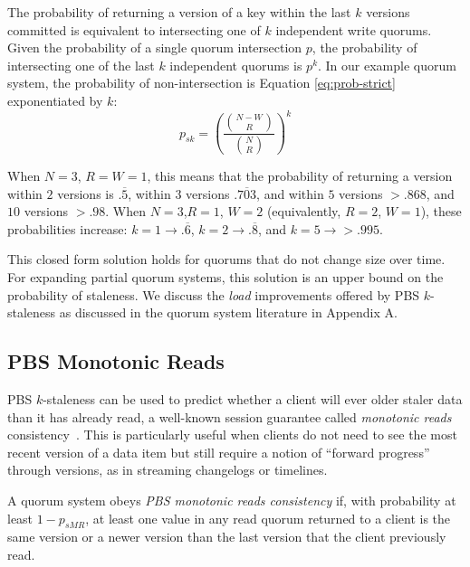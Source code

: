 \documentclass{vldb}
\newcommand{\subsectionskip}{-0em}
\begin{document}
The probability of returning a version of a key within the last $k$
versions committed is equivalent to intersecting one of $k$
independent write quorums.  Given the probability of a single quorum
intersection $p$, the probability of intersecting one of the last $k$
independent quorums is $p^k$.  In our example quorum system, the
probability of non-intersection is Equation \ref{eq:prob-strict}
exponentiated by $k$:
\begin{equation}
\label{eq:k-consistency}
p_{sk} = \left(\frac{{N-W \choose R}}{{N \choose R}}\right)^k
\end{equation}

When $N$$=$$3$, $R$$=$$W$$=$$1$, this means that the probability of
returning a version within $2$ versions is $.\overline{5}$, within $3$
versions $.\overline{703}$, and within $5$ versions $> .868$, and $10$
versions $>.98$.  When $N$$=$$3$,$R$$=$$1$, $W$$=$$2$ (equivalently,
$R$$=$$2$, $W$$=$$1$), these probabilities increase: $k$$=$$1
\rightarrow .\overline{6}$, $k$$=$$2 \rightarrow .\overline{8}$, and
$k$$=$$5 \rightarrow > .995$.

This closed form solution holds for quorums that do not change size
over time.  For expanding partial quorum systems, this solution is an
upper bound on the probability of staleness.  We discuss the
\textit{load} improvements offered by PBS $k$-staleness as discussed
in the quorum system literature in Appendix A.

\vspace{\subsectionskip}\subsection{PBS Monotonic Reads}

PBS $k$-staleness can be used to predict whether a client will ever
older staler data than it has already read, a well-known session
guarantee called \textit{monotonic reads}
consistency~\cite{sessionguarantees}.  This is particularly useful
when clients do not need to see the most recent version of a data item
but still require a notion of ``forward progress'' through versions,
as in streaming changelogs or timelines.

\begin{definition}
\label{def:prob-mr}
A quorum system obeys \textit{PBS monotonic reads consistency} if,
with probability at least $1-p_{sMR}$, at least one value in any
read quorum returned to a client is the same version or a newer
version than the last version that the client previously read.
\end{definition}
\end{document}
